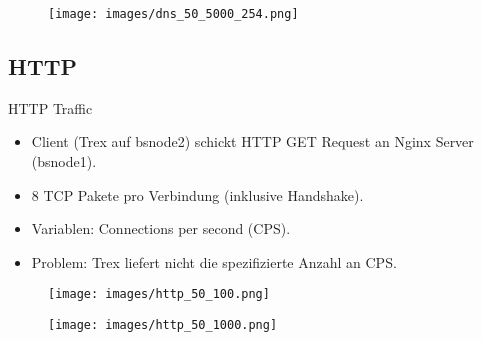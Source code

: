 \documentclass[11pt,german,table,dvipsnames]{beamer}
\begin{document}
\begin{frame}

\begin{figure}
    \centering
    \texttt{[image: images/dns\_50\_5000\_254.png]}
\end{figure}
    
\end{frame}

\subsection{HTTP}

\begin{frame}{HTTP Traffic}
    \begin{itemize}
        \item Client (Trex auf bsnode2) schickt HTTP GET Request an Nginx Server (bsnode1).
        \item 8 TCP Pakete pro Verbindung (inklusive Handshake).
        \item Variablen: Connections per second (CPS).
        \item Problem: Trex liefert nicht die spezifizierte Anzahl an CPS.
    \end{itemize}
    
\end{frame}

\begin{frame}{}
    \begin{figure}
    \centering
    \texttt{[image: images/http\_50\_100.png]}
\end{figure}
\end{frame}

\begin{frame}{}
    \begin{figure}
    \centering
    \texttt{[image: images/http\_50\_1000.png]}
\end{figure}
\end{frame}

\end{document}
